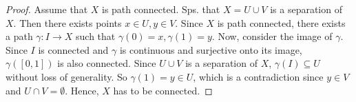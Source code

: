 \begin{proof}
   Assume that \( X \) is path connected.
   Sps. that \( X = U  \cup V \) is a separation
   of \( X \).
   Then there exists points \( x \in U, y \in V \).
   Since \( X \) is path connected, there exists
   a path \( \gamma: I \to X \) such that
   \( \gamma(0) = x, \gamma(1) = y \).
   Now, consider the image of \( \gamma \).
   Since \( I \) is connected
   and \( \gamma  \) is continuous and surjective
   onto its image, \( \gamma ([0, 1]) \) is also
   connected.
   Since \( U \cup V\) is a separation of \( X \),
  \( \gamma(I) \subseteq U \) without
   loss of generality.
    So \( \gamma(1) = y \in U \), which is a contradiction
    since \( y \in V \) and \( U \cap V = \emptyset \).
    Hence, \( X \) has to be connected.
\end{proof}


